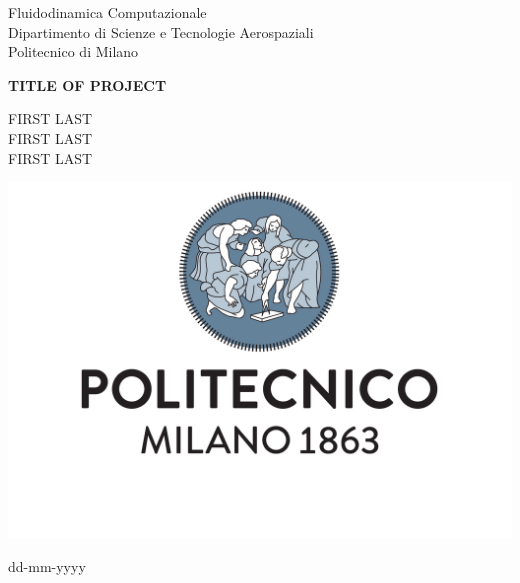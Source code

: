 \documentclass[10pt,english, openany]{book}
\begin{document}

\begin{titlepage}
	\clearpage\thispagestyle{empty}
	\centering
	\vspace{1cm}

	{\normalsize Fluidodinamica Computazionale \\ 
		Dipartimento di Scienze e Tecnologie Aerospaziali \\
		Politecnico di Milano \par}
		\vspace{3cm}
	{\Huge \textbf{TITLE OF PROJECT}} \\
	\vspace{4cm}
	{\normalsize FIRST LAST \\ %
	             FIRST LAST \\
	             FIRST LAST\par}
	\vspace{5cm}
    
    \centering \includegraphics[scale=0.4]{logo1.pdf}
    
    \vspace{0.5cm}
		
	{\normalsize dd-mm-yyyy \par}
	
	\pagebreak

\end{titlepage}
\end{document}
